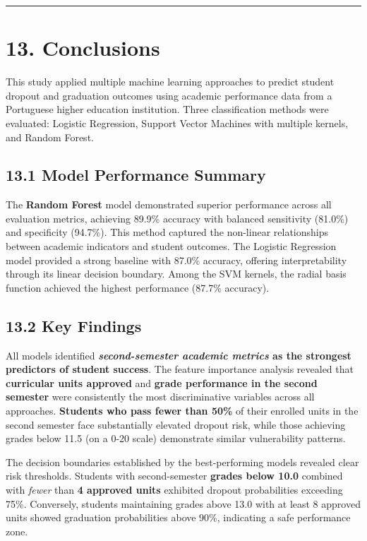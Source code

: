 \documentclass[
]{article}
\begin{document}
\begin{center}\rule{0.5\linewidth}{0.5pt}\end{center}

\section{13. Conclusions}\label{conclusions}

This study applied multiple machine learning approaches to predict
student dropout and graduation outcomes using academic performance data
from a Portuguese higher education institution. Three classification
methods were evaluated: Logistic Regression, Support Vector Machines
with multiple kernels, and Random Forest.

\subsection{13.1 Model Performance
Summary}\label{model-performance-summary}

The \textbf{Random Forest} model demonstrated superior performance
across all evaluation metrics, achieving 89.9\% accuracy with balanced
sensitivity (81.0\%) and specificity (94.7\%). This method captured the
non-linear relationships between academic indicators and student
outcomes. The Logistic Regression model provided a strong baseline with
87.0\% accuracy, offering interpretability through its linear decision
boundary. Among the SVM kernels, the radial basis function achieved the
highest performance (87.7\% accuracy).

\subsection{13.2 Key Findings}\label{key-findings-1}

All models identified \textbf{\emph{second-semester academic metrics} as
the strongest predictors of student success}. The feature importance
analysis revealed that \textbf{curricular units approved} and
\textbf{grade performance in the second semester} were consistently the
most discriminative variables across all approaches. \textbf{Students
who pass fewer than 50\%} of their enrolled units in the second semester
face substantially elevated dropout risk, while those achieving grades
below 11.5 (on a 0-20 scale) demonstrate similar vulnerability patterns.

The decision boundaries established by the best-performing models
revealed clear risk thresholds. Students with second-semester
\textbf{grades below 10.0} combined with \emph{fewer} than \textbf{4
approved units} exhibited dropout probabilities exceeding 75\%.
Conversely, students maintaining grades above 13.0 with at least 8
approved units showed graduation probabilities above 90\%, indicating a
safe performance zone.
\end{document}
